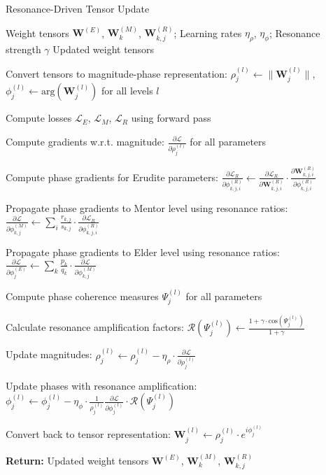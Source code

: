 \begin{algorithm}
\caption{Resonance-Driven Tensor Update}
\begin{algorithmic}[1]
\Require Weight tensors $\mathbf{W}^{(E)}$, $\mathbf{W}^{(M)}_k$, $\mathbf{W}^{(R)}_{k,j}$; Learning rates $\eta_{\rho}$, $\eta_{\phi}$; Resonance strength $\gamma$
\Ensure Updated weight tensors

\State Convert tensors to magnitude-phase representation:
\State $\rho^{(l)}_j \leftarrow \|\mathbf{W}^{(l)}_j\|$, $\phi^{(l)}_j \leftarrow \text{arg}(\mathbf{W}^{(l)}_j)$ for all levels $l$

\State Compute losses $\mathcal{L}_E$, $\mathcal{L}_M$, $\mathcal{L}_R$ using forward pass

\State Compute gradients w.r.t. magnitude: $\frac{\partial \mathcal{L}}{\partial \rho^{(l)}_j}$ for all parameters

\State Compute phase gradients for Erudite parameters:
\State $\frac{\partial \mathcal{L}_R}{\partial \phi^{(R)}_{k,j,i}} \leftarrow \frac{\partial \mathcal{L}_R}{\partial \mathbf{W}^{(R)}_{k,j,i}} \cdot \frac{\partial \mathbf{W}^{(R)}_{k,j,i}}{\partial \phi^{(R)}_{k,j,i}}$

\State Propagate phase gradients to Mentor level using resonance ratios:
\State $\frac{\partial \mathcal{L}}{\partial \phi^{(M)}_{k,j}} \leftarrow \sum_i \frac{r_{k,j}}{s_{k,j}} \cdot \frac{\partial \mathcal{L}_R}{\partial \phi^{(R)}_{k,j,i}}$

\State Propagate phase gradients to Elder level using resonance ratios:
\State $\frac{\partial \mathcal{L}}{\partial \phi^{(E)}_j} \leftarrow \sum_k \frac{p_k}{q_k} \cdot \frac{\partial \mathcal{L}}{\partial \phi^{(M)}_{k,j}}$

\State Compute phase coherence measures $\Psi^{(l)}_j$ for all parameters

\State Calculate resonance amplification factors:
\State $\mathcal{R}(\Psi^{(l)}_j) \leftarrow \frac{1 + \gamma \cdot \text{cos}(\Psi^{(l)}_j)}{1 + \gamma}$

\State Update magnitudes:
\State $\rho^{(l)}_j \leftarrow \rho^{(l)}_j - \eta_{\rho} \cdot \frac{\partial \mathcal{L}}{\partial \rho^{(l)}_j}$

\State Update phases with resonance amplification:
\State $\phi^{(l)}_j \leftarrow \phi^{(l)}_j - \eta_{\phi} \cdot \frac{1}{\rho^{(l)}_j}\frac{\partial \mathcal{L}}{\partial \phi^{(l)}_j} \cdot \mathcal{R}(\Psi^{(l)}_j)$

\State Convert back to tensor representation:
\State $\mathbf{W}^{(l)}_j \leftarrow \rho^{(l)}_j \cdot e^{i\phi^{(l)}_j}$

\State \textbf{Return:} Updated weight tensors $\mathbf{W}^{(E)}$, $\mathbf{W}^{(M)}_k$, $\mathbf{W}^{(R)}_{k,j}$
\end{algorithmic}
\end{algorithm}

